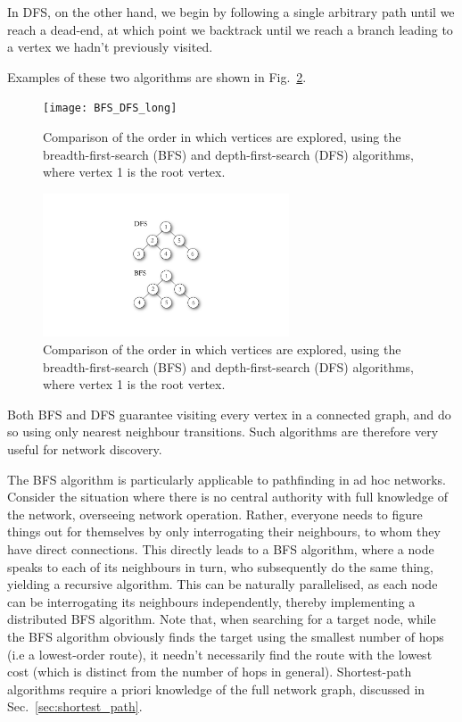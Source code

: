 In DFS, on the other hand, we begin by following a single arbitrary path until we reach a dead-end, at which point we backtrack until we reach a branch leading to a vertex we hadn't previously visited.

Examples of these two algorithms are shown in Fig.~\ref{fig:BFS_DFS}.

\pubmode
	\begin{figure}[!htbp]
	\texttt{[image: BFS\_DFS\_long]}
	\captionspace \caption{Comparison of the order in which vertices are explored, using the breadth-first-search (BFS) and depth-first-search (DFS) algorithms, where vertex 1 is the root vertex.} \label{fig:BFS_DFS}
	\end{figure}
\else
	\begin{figure}[!htbp]
	\includegraphics[width=0.65\textwidth]{BFS_DFS}
	\captionspace \caption{Comparison of the order in which vertices are explored, using the breadth-first-search (BFS) and depth-first-search (DFS) algorithms, where vertex 1 is the root vertex.} \label{fig:BFS_DFS}
	\end{figure}
\fi

Both BFS and DFS guarantee visiting every vertex in a connected graph, and do so using only nearest neighbour transitions. Such algorithms are therefore very useful for network discovery.

The BFS algorithm is particularly applicable to pathfinding in ad hoc networks. Consider the situation where there is no central authority with full knowledge of the network, overseeing network operation. Rather, everyone needs to figure things out for themselves by only interrogating their neighbours, to whom they have direct connections. This directly leads to a BFS algorithm, where a node speaks to each of its neighbours in turn, who subsequently do the same thing, yielding a recursive algorithm. This can be naturally parallelised, as each node can be interrogating its neighbours independently, thereby implementing a distributed BFS algorithm. Note that, when searching for a target node, while the BFS algorithm obviously finds the target using the smallest number of hops (i.e a lowest-order route), it needn't necessarily find the route with the lowest cost (which is distinct from the number of hops in general). Shortest-path algorithms require a priori knowledge of the full network graph, discussed in Sec.~\ref{sec:shortest_path}.

